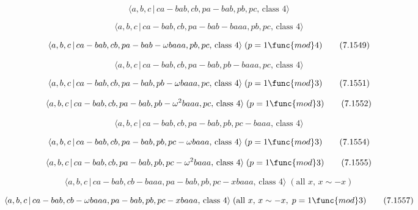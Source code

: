\documentclass[10pt]{article}
\begin{document}
\begin{equation}
\langle a,b,c\,|\,ca-bab,cb,pa-bab,pb,pc,\,\text{class }4\rangle 
\tag{7.1547}
\end{equation}

\begin{equation}
\langle a,b,c\,|\,ca-bab,cb,pa-bab-baaa,pb,pc,\,\text{class }4\rangle 
\tag{7.1548}
\end{equation}

\begin{equation}
\langle a,b,c\,|\,ca-bab,cb,pa-bab-\omega baaa,pb,pc,\,\text{class }4\rangle
\;(p=1\func{mod}4)  \tag{7.1549}
\end{equation}

\begin{equation}
\langle a,b,c\,|\,ca-bab,cb,pa-bab,pb-baaa,pc,\,\text{class }4\rangle 
\tag{7.1550}
\end{equation}

\begin{equation}
\langle a,b,c\,|\,ca-bab,cb,pa-bab,pb-\omega baaa,pc,\,\text{class }4\rangle
\;(p=1\func{mod}3)  \tag{7.1551}
\end{equation}

\begin{equation}
\langle a,b,c\,|\,ca-bab,cb,pa-bab,pb-\omega ^{2}baaa,pc,\,\text{class }%
4\rangle \;(p=1\func{mod}3)  \tag{7.1552}
\end{equation}

\begin{equation}
\langle a,b,c\,|\,ca-bab,cb,pa-bab,pb,pc-baaa,\,\text{class }4\rangle 
\tag{7.1553}
\end{equation}

\begin{equation}
\langle a,b,c\,|\,ca-bab,cb,pa-bab,pb,pc-\omega baaa,\,\text{class }4\rangle
\;(p=1\func{mod}3)  \tag{7.1554}
\end{equation}

\begin{equation}
\langle a,b,c\,|\,ca-bab,cb,pa-bab,pb,pc-\omega ^{2}baaa,\,\text{class }%
4\rangle \;(p=1\func{mod}3)  \tag{7.1555}
\end{equation}

\begin{equation}
\langle a,b,c\,|\,ca-bab,cb-baaa,pa-bab,pb,pc-xbaaa,\,\text{class }4\rangle
\;(\text{all }x,\,x\sim -x)  \tag{7.1556}
\end{equation}

\begin{equation}
\langle a,b,c\,|\,ca-bab,cb-\omega baaa,pa-bab,pb,pc-xbaaa,\,\text{class }%
4\rangle \;(\text{all }x,\,x\sim -x,\;p=1\func{mod}3)  \tag{7.1557}
\end{equation}
\end{document}
